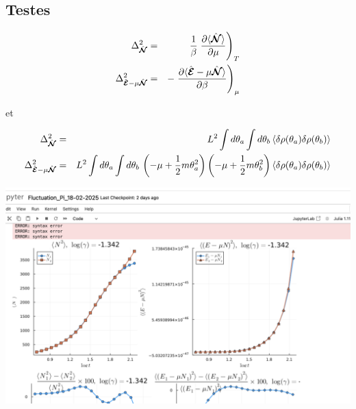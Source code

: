 \subsection{Testes}

\begin{eqnarray*}
	\Delta_{\hat{\bm{\mathcal{N}}}}^2  & = &  \frac{1}{\beta} \left . \frac{\partial \langle \hat{\bm{\mathcal{N}}} \rangle}{\partial \mu} \right )_T \\
	\Delta_{\hat{\bm{\mathcal{E}}}-\mu \hat{\bm{\mathcal{N}}}}^2  & = &  - \left . \frac{\partial \langle \hat{\bm{\mathcal{E}}}-\mu \hat{\bm{\mathcal{N}}} \rangle}{\partial \beta} \right )_\mu 
\end{eqnarray*}

et 

\begin{eqnarray*}
	\Delta_{\hat{\bm{\mathcal{N}}}}^2  &= & L^2 \int d\theta_a \int d \theta_b \, \langle \delta \rho(\theta_a) \delta \rho(\theta_b) \rangle \\
	\Delta_{\hat{\bm{\mathcal{E}}}-\mu \hat{\bm{\mathcal{N}}}}^2  & = & L^2 \int d\theta_a \int d \theta_b \, \left ( - \mu + \frac{1}2 m \theta_a^2  \right  )\left ( - \mu + \frac{1}2 m \theta_b^2  \right  )  \langle \delta \rho(\theta_a) \delta \rho(\theta_b) \rangle
\end{eqnarray*}

\includegraphics[width=1\textwidth]{Figures/test}



